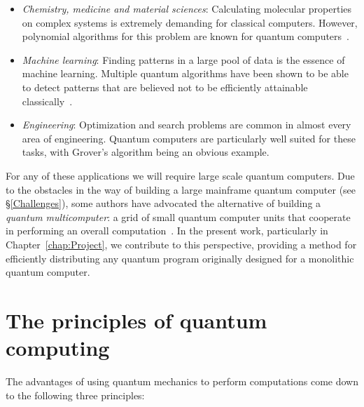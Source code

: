\begin{itemize}
\item \textit{Chemistry, medicine and material sciences}: Calculating molecular properties on complex systems is extremely demanding for classical computers. However, polynomial algorithms for this problem are known for quantum computers~\citep{TowardsQuantumChemistry}. %
\item \textit{Machine learning}: Finding patterns in a large pool of data is the essence of machine learning. Multiple quantum algorithms have been shown to be able to detect patterns that are believed not to be efficiently attainable classically~\citep{QuantumMachineLearning}.
\item \textit{Engineering}: Optimization and search problems are common in almost every area of engineering. Quantum computers are particularly well suited for these tasks, with Grover's algorithm being an obvious example.
\end{itemize}

For any of these applications we will require large scale quantum computers. Due to the obstacles in the way of building a large mainframe quantum computer (see \S\ref{Challenges}), some authors have advocated the alternative of building a \textit{quantum multicomputer}: a grid of small quantum computer units that cooperate in performing an overall computation~\citep{DistributedQCHW}. In the present work, particularly in Chapter~\ref{chap:Project}, we contribute to this perspective, providing a method for efficiently distributing any quantum program originally designed for a monolithic quantum computer.

\section{The principles of quantum computing}
\label{Principles}

The advantages of using quantum mechanics to perform computations come down to the following three principles:

